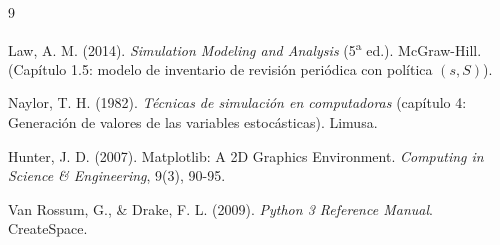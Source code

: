 \documentclass[11pt]{article}
\begin{document}
\begin{thebibliography}{9}

Law, A. M. (2014). \emph{Simulation Modeling and Analysis}
(5\textsuperscript{a} ed.). McGraw-Hill. (Cap\'itulo 1.5: modelo de inventario
de revisi\'on peri\'odica con pol\'itica $(s, S)$).

Naylor, T. H. (1982). \emph{T\'ecnicas de simulaci\'on en computadoras}
(cap\'itulo 4: Generaci\'on de valores de las variables estoc\'asticas).
Limusa.

Hunter, J. D. (2007). Matplotlib: A 2D Graphics Environment.
\emph{Computing in Science \& Engineering}, 9(3), 90-95.

Van Rossum, G., \& Drake, F. L. (2009). \emph{Python 3 Reference Manual}.
CreateSpace.

\end{thebibliography}
\end{document}
